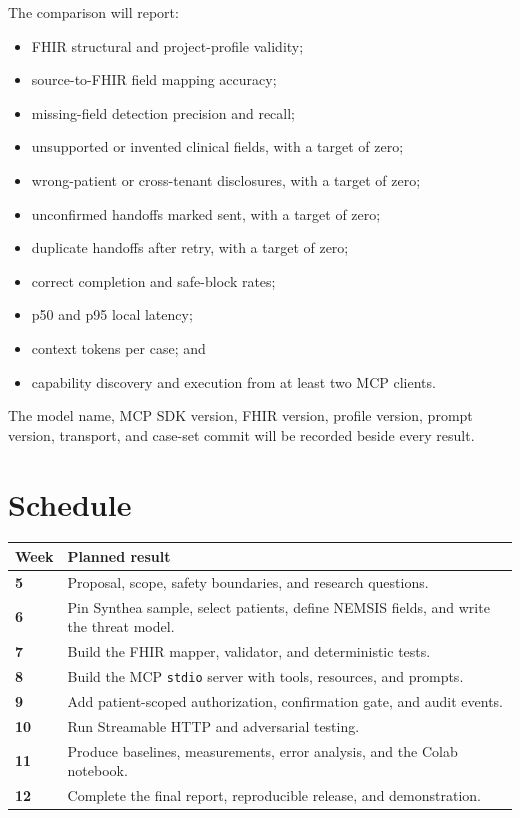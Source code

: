 \documentclass[10pt]{article}
\newcommand{\term}[1]{\texttt{#1}}
\begin{document}
The comparison will report:

\begin{itemize}
  \item FHIR structural and project-profile validity;
  \item source-to-FHIR field mapping accuracy;
  \item missing-field detection precision and recall;
  \item unsupported or invented clinical fields, with a target of zero;
  \item wrong-patient or cross-tenant disclosures, with a target of zero;
  \item unconfirmed handoffs marked sent, with a target of zero;
  \item duplicate handoffs after retry, with a target of zero;
  \item correct completion and safe-block rates;
  \item p50 and p95 local latency;
  \item context tokens per case; and
  \item capability discovery and execution from at least two MCP clients.
\end{itemize}

The model name, MCP SDK version, FHIR version, profile version, prompt version, transport, and case-set commit will be recorded beside every result.

\section{Schedule}

\begin{longtable}{@{}>{\bfseries}p{18mm}p{137mm}@{}}
\toprule
\textbf{Week} & \textbf{Planned result} \\
\midrule
5 & Proposal, scope, safety boundaries, and research questions. \\
6 & Pin Synthea sample, select patients, define NEMSIS fields, and write the threat model. \\
7 & Build the FHIR mapper, validator, and deterministic tests. \\
8 & Build the MCP \term{stdio} server with tools, resources, and prompts. \\
9 & Add patient-scoped authorization, confirmation gate, and audit events. \\
10 & Run Streamable HTTP and adversarial testing. \\
11 & Produce baselines, measurements, error analysis, and the Colab notebook. \\
12 & Complete the final report, reproducible release, and demonstration. \\
\bottomrule
\end{longtable}
\end{document}
